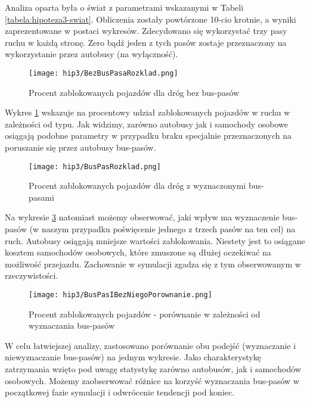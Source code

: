 \documentclass{article}
\begin{document}
Analiza oparta była o świat z parametrami wskazanymi w Tabeli \ref{tabela:hipoteza3-swiat}. Obliczenia zostały powtórzone 10-cio krotnie, a wyniki zaprezentowane w postaci wykresów. Zdecydowano się wykorzystać trzy pasy ruchu w każdą stronę. Zero bądź jeden z tych pasów zostaje przeznaczony na wykorzystanie przez autobusy (na wyłączność). 

\begin{figure}[!h]
\centering
    \texttt{[image: hip3/BezBusPasaRozklad.png]}
    \caption{Procent zablokowanych pojazdów dla dróg bez bus-pasów}
    \label{fig:bez-bus-pasa-rozklad}
\end{figure}

Wykres \ref{fig:bez-bus-pasa-rozklad} wskazuje na procentowy udział zablokowanych pojazdów w ruchu w zależności od typu. Jak widzimy, zarówno autobusy jak i samochody osobowe osiągają podobne parametry w przypadku braku specjalnie przeznaczonych na poruszanie się przez autobusy bus-pasów.

\begin{figure}[!h]
\centering
    \texttt{[image: hip3/BusPasRozklad.png]}
    \caption{Procent zablokowanych pojazdów dla dróg z wyznaczonymi bus-pasami}
    \label{fig:bus-pas-rozklad}
\end{figure}

Na wykresie \ref{fig:bus-pas-rozklad} natomiast możemy obserwować, jaki wpływ ma wyznaczenie bus-pasów (w naszym przypadku poświęcenie jednego z trzech pasów na ten cel) na ruch. Autobusy osiągają mniejsze wartości zablokowania. Niestety jest to osiągane kosztem samochodów osobowych, które zmuszone są dłużej oczekiwać na możliwość przejazdu. Zachowanie w symulacji zgadza się z tym obserwowanym w rzeczywistości.

\begin{figure}[!h]
\centering
    \texttt{[image: hip3/BusPasIBezNiegoPorownanie.png]}
    \caption{Procent zablokowanych pojazdów - porównanie w zależności od wyznaczania bus-pasów}
    \label{fig:bus-pas-rozklad}
\end{figure}

W celu łatwiejszej analizy, zastosowano porównanie obu podejść (wyznaczanie i niewyznaczanie bus-pasów) na jednym wykresie. Jako charakterystykę zatrzymania wzięto pod uwagę statystykę zarówno autobusów, jak i samochodów osobowych. Możemy zaobserwować różnice na korzyść wyznaczania bus-pasów w początkowej fazie symulacji i odwrócenie tendencji pod koniec.
\end{document}

